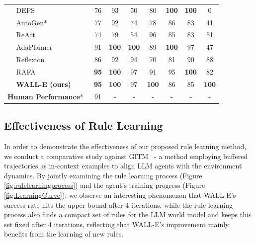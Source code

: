 \documentclass{article} %
\begin{document}
\begin{table}[t]
\begin{center}
{\begin{tabular}{llccccccc}
                                                   & DEPS~\citep{wang2023describe} & 76          & 93          & 50          &  80         & \textbf{100}          & \textbf{100}          & 0          \\
                                                   & AutoGen*~\citep{wu2023autogen} & 77          & 92          & 74          &  78         & 86          &  83         &  41         \\
                                                   & ReAct~\citep{yao2023react} & 74          & 79           & 54           & 96          & 85        & 83        & 51        \\
                                                   & AdaPlanner~\citep{sun2024adaplanner}& 91        & \textbf{100} & \textbf{100} & 89           & \textbf{100} & 97           & 47           \\
                                                   & Reflexion~\citep{shinn2024reflexion}& 86          & 92           & 94           & 70           & 81           & 90           & 88           \\
                                                   & RAFA~\citep{liu2023reason}& \textbf{95} & \textbf{100} & 97           & 91           & 95           & \textbf{100} & 82           \\
                                                   & \textbf{WALL-E (ours)}     &  \textbf{95} & \textbf{100} & 97           & \textbf{100} & 86           & 85           & \textbf{100} \\ \midrule
    \multicolumn{2}{l}{\textbf{Human Performance}*~\citep{cvpr/alfred}}          & 91 & - & - & - & -  & -   & -    \\ \bottomrule
    \end{tabular}
    }
\end{center}
\end{table}






\subsection{Effectiveness of Rule Learning}

In order to demonstrate the effectiveness of our proposed rule learning method, we conduct a comparative study against GITM~\citep{zhu2023ghost} - a method employing buffered trajectories as in-context examples to align LLM agents with the environment dynamics.
By jointly examining the rule learning process (Figure \ref{fig:rulelearningprocess}) and the agent's training progress (Figure \ref{fig:LearningCurve}), we observe an interesting phenomenon that WALL-E's success rate hits the upper bound after 4 iterations, while the rule learning process also finds a compact set of rules for the LLM world model and keeps this set fixed after 4 iterations, reflecting that WALL-E's improvement mainly benefits from the learning of new rules.
\end{document}
